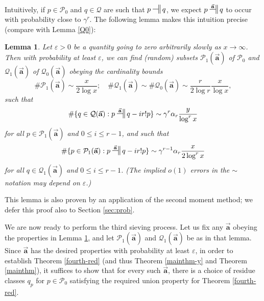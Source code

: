\documentclass[12pt]{amsart}
\numberwithin{equation}{section}  %
\theoremstyle{remark}
\theoremstyle{plain}
\newtheorem{lem}{Lemma}[section]
\numberwithin{equation}{section}
\newcommand{\eps}{\ensuremath{\varepsilon}}
\renewcommand{\leq}{\leqslant}
\renewcommand{\(}{\left(}
\renewcommand{\)}{\right)}
\newcommand{\asym}{\sim}   %
\newcommand{\relr}{\nsdtstile{}{}} %
\newcommand{\relra}{\nsdtstile{}{\vect{\mathbf{a}}}} %
\newcommand{\vect}[1]{{\ensuremath{\vec{#1}}}}
\newcommand{\PP}{\mathcal{P}}
\newcommand{\QQ}{\mathcal{Q}}
\begin{document}
Intuitively, if $p \in \PP_0$ and $q \in \QQ$ are such that $p \relr q$, we expect $p \relra q$ to occur with probability close to $\gamma^r$.  The following lemma makes this intuition precise (compare with Lemma \ref{Q0}):


\begin{lem}\label{sieveunited} 
Let $\eps > 0$ be a quantity going to zero arbitrarily slowly as $x \to \infty$.
Then with probability at least $\eps$, we can find (random) subsets
$\PP_1(\vect{\mathbf{a}})$  of $\PP_0$ and $\QQ_1(\vect{\mathbf{a}})$
of $\QQ_0(\vect{\mathbf{a}})$ obeying the cardinality
bounds
\begin{equation}\label{ppqq1}
\# \PP_1(\vect{\mathbf{a}}) \asym \frac{x}{2\log x}; \quad \# \QQ_1(\vect{\mathbf{a}}) \asym \# \QQ_0(\vect{\mathbf{a}}) \asym \frac{r}{2\log r} \frac{x}{\log x},
\end{equation}
such that
$$ \# \{ q \in \QQ(\vect{\mathbf{a}}): p \relra q - ir! p \} \asym \gamma^r\alpha_r\frac y{\log^r x}$$
for \emph{all} $p \in \PP_1(\vect{\mathbf{a}})$ and $0 \leq i \leq r-1$, and such that
$$ \# \{ p \in \PP_1(\vect{\mathbf{a}}):  p \relra q - ir! p \} \asym \gamma^{r-1} \alpha_r \frac{x}{2\log^r x} $$
for \emph{all} $q \in \QQ_1(\vect{\mathbf{a}})$ and $0 \leq i \leq
r-1$.  (The implied $o(1)$ errors in the $\asym$ notation may depend on $\eps$.)
\end{lem}

This lemma is also proven by an application of the second moment method; we defer this proof also to Section \ref{sec:prob}.

We are now ready to perform the third sieving process.
 Let us fix any $\vect{\mathbf{a}}$ obeying the
properties in Lemma \ref{sieveunited}, and let
$\PP_1(\vect{\mathbf{a}})$ and $\QQ_1(\vect{\mathbf{a}})$ be as in
that lemma.  Since $\vect{\mathbf{a}}$ has the desired properties 
with probability at least $\eps$, in order to establish
Theorem \ref{fourth-red} (and thus Theorem \ref{mainthm-y} and Theorem
\ref{mainthm}), it suffices to show that for every such
 $\vect{\mathbf{a}}$, there is a choice of residue classes $q_p$ for 
$p\in \PP_0$ satisfying the required union property for Theorem
\ref{fourth-red}.
\end{document}
